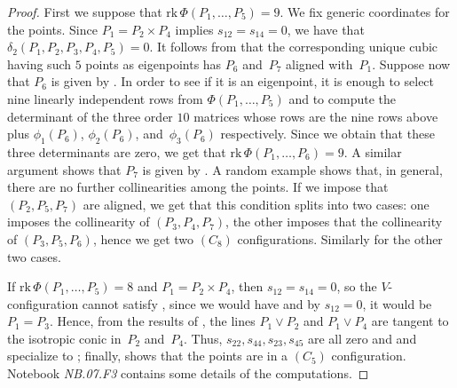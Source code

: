 \documentclass[a4paper, 11pt, reqno]{amsart}
\theoremstyle{plain}
\theoremstyle{definition}
\newcommand{\nb}[2]{\textsl{{NB}.{#1}.{#2}}}
\newcommand{\rk}{\ensuremath{\mathrm{rk}}}
\begin{document}
%
\begin{proof}
First we suppose that $\rk \, \Phi(P_1, \dotsc, P_5) = 9$.
We fix generic coordinates for the points.
Since $P_1 = P_2 \times P_4$ implies $s_{12}=s_{14}=0$,
we have that $\delta_2 (P_1,P_2,P_3,P_4,P_5)=0$. 
It follows from  that the corresponding unique cubic having such $5$ points as eigenpoints has $P_6$ and~$P_7$ aligned with~$P_1$.
Suppose now that $P_6$ is given by .
In order to see if it is an eigenpoint, it is enough to select nine linearly independent rows from $\Phi(P_1, \dotsc, P_5)$
and to compute the determinant of the three order $10$ matrices whose rows are the nine rows above plus $\phi_1(P_6)$, $\phi_2(P_6)$, and~$\phi_3(P_6)$ respectively.
Since we obtain that these three determinants are zero, we get that $\rk \, \Phi(P_1, \dotsc, P_6) = 9$.
A similar argument shows that $P_7$ is given by .
A random example shows that, in general, there are no further collinearities among the points.
If we impose that $(P_2, P_5, P_7)$ are aligned, we get that this condition splits into two cases:
one imposes the collinearity of $(P_3, P_4, P_7)$, the other imposes that the collinearity of $(P_3, P_5, P_6)$,
hence we get two $(C_8)$ configurations. Similarly for the other two cases. 

If $\rk \, \Phi(P_1, \dotsc, P_5) = 8$ and $P_1 = P_2 \times P_4$, then $s_{12} = s_{14} = 0$, so the $V$- configuration cannot satisfy , since we would have  and by $s_{12} = 0$, it would be $P_1 = P_3$. Hence,
from the results of , the lines $P_1 \vee P_2$ and $P_1 \vee P_4$ are tangent to the isotropic conic in~$P_2$ and~$P_4$. Thus, $s_{22}, s_{44}, s_{23}, s_{45}$ are all zero and  and  specialize to ; finally,  shows that the points are in a $(C_5)$ configuration. Notebook \nb{07}{F3} contains some details of the computations.
\end{proof}
%
\end{document}

